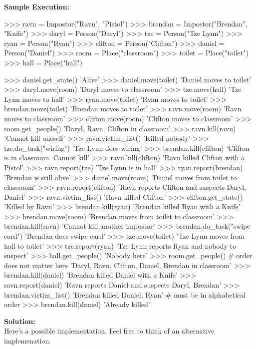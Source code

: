 \newpage
\textbf{Sample Execution:}
\begin{python}
>>> ravn = Impostor("Ravn", "Pistol")
>>> brendan = Impostor("Brendan", "Knife")
>>> daryl = Person("Daryl")
>>> tze = Person("Tze Lynn")
>>> ryan = Person("Ryan")
>>> clifton = Person("Clifton")
>>> daniel = Person("Daniel")
>>> room = Place("classroom")
>>> toilet = Place("toilet")
>>> hall = Place("hall")

>>> daniel.get_state()
'Alive'
>>> daniel.move(toilet)
'Daniel moves to toilet'
>>> daryl.move(room)
'Daryl moves to classroom'
>>> tze.move(hall)
'Tze Lynn moves to hall'
>>> ryan.move(toilet)
'Ryan moves to toilet'
>>> brendan.move(toilet)
'Brendan moves to toilet'
>>> ravn.move(room)
'Ravn moves to classroom'
>>> clifton.move(room)
'Clifton moves to classroom'
>>> room.get_people()
'Daryl, Ravn, Clifton in classroom'
>>> ravn.kill(ravn)
'Cannot kill oneself'
>>> ravn.victim_list()
'Killed nobody'
>>> tze.do_task("wiring")
'Tze Lynn does wiring'
>>> brendan.kill(clifton)
'Clifton is in classroom. Cannot kill'
>>> ravn.kill(clifton)
'Ravn killed Clifton with a Pistol'
>>> ravn.report(tze)
'Tze Lynn is in hall'
>>> ryan.report(brendan)
'Brendan is still alive'
>>> daniel.move(room)
'Daniel moves from toilet to classroom'
>>> ravn.report(clifton)
'Ravn reports Clifton and suspects Daryl, Daniel'
>>> ravn.victim_list()
'Ravn killed Clifton'
>>> clifton.get_state()
'Killed by Ravn'
>>> brendan.kill(ryan)
'Brendan killed Ryan with a Knife'
>>> brendan.move(room)
'Brendan moves from toilet to classroom'
>>> brendan.kill(ravn)
'Cannot kill another impostor'
>>> brendan.do_task("swipe card")
'Brendan does swipe card'
>>> tze.move(toilet)
'Tze Lynn moves from hall to toilet'
>>> tze.report(ryan)
'Tze Lynn reports Ryan and nobody to suspect'
>>> hall.get_people()
'Nobody here'
>>> room.get_people()    # order does not matter here
'Daryl, Ravn, Clifton, Daniel, Brendan in classroom'
>>> brendan.kill(daniel)
'Brendan killed Daniel with a Knife'
>>> ravn.report(daniel)
'Ravn reports Daniel and suspects Daryl, Brendan'
>>> brendan.victim_list()
'Brendan killed Daniel, Ryan'   # must be in alphabetical order
>>> brendan.kill(daniel)
'Already killed'
\end{python}
\textbf{Solution:} \\
Here's a possible implementation. Feel free to think of an alternative implemenation.
